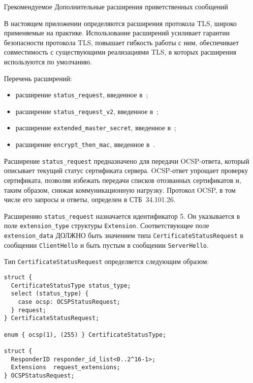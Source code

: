 \begin{appendix}{Г}{рекомендуемое}
{Дополнительные расширения приветственных сообщений}
\label{EXTS}


В настоящем приложении определяются расширения протокола TLS, широко 
применяемые на практике.
%
Использование расширений усиливает гарантии безопасности протокола TLS, 
повышает гибкость работы с ним, обеспечивает совместимость с существующими 
реализациями TLS, в которых расширения используются по умолчанию.

Перечень расширений:
\begin{itemize}
\item
расширение \verb|status_request|, введенное в~\cite{RFC6066};
\item
расширение \verb|status_request_v2|, введенное в~\cite{RFC6961};
\item
расширение \verb|extended_master_secret|, введенное в~\cite{RFC7627};
\item
расширение \verb|encrypt_then_mac|, введенное в~\cite{RFC7366}.
\end{itemize}

\label{TLSEx.SR}

Расширение \lstinline{status_request} предназначено для передачи OCSP-ответа,
который описывает текущий статус сертификата сервера. OCSP-ответ упрощает 
проверку сертификата, позволяя избежать передачи списков отозванных 
сертификатов и, таким образом, снижая коммуникационную нагрузку. Протокол OCSP, 
в том числе его запросы и ответы, определен в СТБ~34.101.26.

Расширению \lstinline{status_request} назначается идентификатор 5. Он указывается
в поле \lstinline{extension_type} структуры \lstinline{Extension}.
Соответствующее поле \lstinline{extension_data} ДОЛЖНО быть значением типа
\lstinline{CertificateStatusRequest} в сообщении \lstinline{ClientHello} и
быть пустым в сообщении \lstinline{ServerHello}.

Тип \lstinline{CertificateStatusRequest} определяется следующим образом:

\begin{lstlisting}
struct {
  CertificateStatusType status_type;
  select (status_type) {
    case ocsp: OCSPStatusRequest;
  } request;
} CertificateStatusRequest;

enum { ocsp(1), (255) } CertificateStatusType;

struct {
  ResponderID responder_id_list<0..2^16-1>;
  Extensions  request_extensions;
} OCSPStatusRequest;


\end{lstlisting}
\end{appendix}
